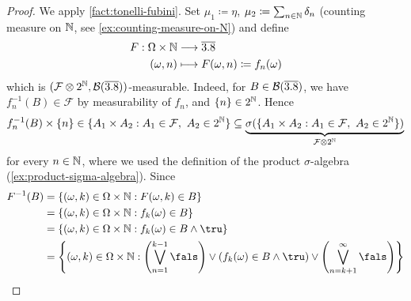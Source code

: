 \begin{proof}
We apply \autoref{fact:tonelli-fubini}.
Set
\(
\mu_1 \coloneq \eta
\),
\(
\mu_2 \coloneq \sum_{n\in\mathbb{N}}\delta_n
\) (counting measure on $\mathbb{N}$, see \autoref{ex:counting-measure-on-N})
and define
\[
\begin{aligned}
F : \Omega \times \mathbb{N} &\longrightarrow \overline{3.8} \\
(\omega,n) &\longmapsto F(\omega,n) \coloneq f_n(\omega)
\end{aligned}
\]
which is \((\mathcal{F}\otimes 2^{\mathbb{N}},\mathcal{B}(\overline{3.8}))\)-measurable.
Indeed, for $B \in \mathcal{B}(\overline{3.8})$, we have
$f_n^{-1}(B) \in \mathcal{F}$ by measurability of $f_n$, and
$\{n\} \in 2^{\mathbb{N}}$.
Hence
\[
f_n^{-1}(B)\times\{n\}
\in
\{A_1 \times A_2 : A_1 \in \mathcal{F},\ A_2 \in 2^{\mathbb{N}}\}
\subseteq
\underbrace{
\sigma(\{A_1 \times A_2 : A_1 \in \mathcal{F},\ A_2 \in 2^{\mathbb{N}}\})
}_{\mathcal{F}\otimes 2^{\mathbb{N}}}
\]
for every $n \in \mathbb{N}$, where we used the definition of the product $\sigma$-algebra (\autoref{ex:product-sigma-algebra}).
Since 
\[
\begin{aligned}
F^{-1}(B)
&=
\{(\omega,k) \in \Omega \times \N : F(\omega,k) \in B\} \\
&=
\{(\omega,k) \in \Omega \times \N : f_k(\omega) \in B\} \\
&=
\{(\omega,k) \in \Omega \times \N :  f_k(\omega) \in B \wedge \tru \} \\ 
&=
\left\{(\omega,k) \in \Omega \times \N : \left(\bigvee_{n = 1}^{k - 1} \fals \right) \vee (f_k(\omega) \in B \wedge \tru) \vee \left(\bigvee_{n = k + 1}^{\infty} \fals \right)\right\} \\

\end{aligned}\]
\end{proof}
